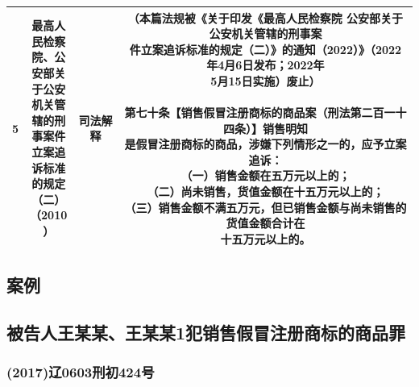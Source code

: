 \documentclass[
    a4paper
    ]{ctexart}
\begin{document}
{{\begin{longtable}{|c|c|c|c|}
                5 & \makecell[l]{最高人\\民检察\\院、公\\安部关\\于公安\\机关管\\辖的刑\\事案件\\立案追\\诉标准\\的规定\\（二）\\（2010\\）} & 司法解释 & \makecell[l]{
                    （本篇法规被《关于印发《最高人民检察院 公安部关于公安机关管辖的刑事案\\
                    件立案追诉标准的规定（二）》的通知（2022）》（2022年4月6日发布；2022年\\
                    5月15日实施）废止）\\
                    \\
                    第七十条\quad 【销售假冒注册商标的商品案（刑法第二百一十四条）】销售明知\\
                    是假冒注册商标的商品，涉嫌下列情形之一的，应予立案追诉：\\
                    \qquad （一）销售金额在五万元以上的；\\
                    \qquad （二）尚未销售，货值金额在十五万元以上的；\\
                    \qquad （三）销售金额不满五万元，但已销售金额与尚未销售的货值金额合计在\\
                    十五万元以上的。
                } \\
                \hline
              \end{longtable}
            }

            \begin{sloppy}
            \section{\textbf{案例}}
            \subsection{被告人王某某、王某某1犯销售假冒注册商标的商品罪}
            \subsubsection*{(2017)辽0603刑初424号}
            

\end{sloppy}}
\end{document}
